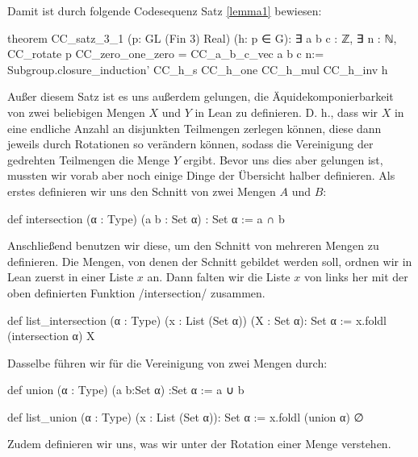 \documentclass[10pt]{article}
\begin{document}
\noindent Damit ist durch folgende Codesequenz Satz \ref{lemma1} bewiesen:
\begin{leancode}
theorem CC_satz_3_1 (p: GL (Fin 3) Real) (h: p ∈ G):
       ∃ a b c : ℤ, ∃ n : ℕ, CC_rotate p CC_zero_one_zero = CC_a_b_c_vec a b c n:=
  Subgroup.closure_induction' CC_h_s CC_h_one CC_h_mul CC_h_inv h
\end{leancode}

\noindent Außer diesem Satz ist es uns außerdem gelungen, die Äquidekomponierbarkeit von zwei beliebigen Mengen $X$ und $Y$ in Lean zu definieren. D. h., dass wir $X$ in eine endliche Anzahl an disjunkten Teilmengen zerlegen können, diese dann jeweils durch Rotationen so verändern können, sodass die Vereinigung der gedrehten Teilmengen die Menge $Y$ ergibt. Bevor uns dies aber gelungen ist, mussten wir vorab aber noch einige Dinge der Übersicht halber definieren. Als erstes definieren wir uns den Schnitt von zwei Mengen $A$ und $B$:
\begin{leancode}
def intersection (α : Type) (a b : Set α) : Set α := a ∩ b
\end{leancode}
\noindent Anschließend benutzen wir diese, um den Schnitt von mehreren Mengen zu definieren. Die Mengen, von denen der Schnitt gebildet werden soll, ordnen wir in Lean zuerst in einer Liste $x$ an. Dann falten wir die Liste $x$ von links her mit der oben definierten Funktion \lean/intersection/ zusammen.
\begin{leancode}
def list_intersection (α : Type) (x : List (Set α)) (X : Set α): Set α :=
  x.foldl (intersection α) X
\end{leancode}
\noindent Dasselbe führen wir für die Vereinigung von zwei Mengen durch:
\begin{leancode}
def union (α : Type) (a b:Set α) :Set α := a ∪ b

def list_union (α : Type) (x : List (Set α)): Set α :=
  x.foldl (union α) ∅
\end{leancode}
\noindent Zudem definieren wir uns, was wir unter der Rotation einer Menge verstehen.
\end{document}
